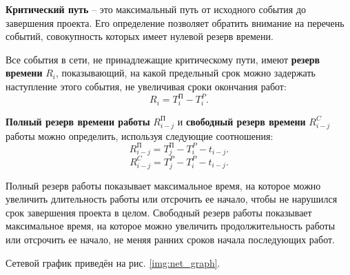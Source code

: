 \textbf{Критический путь} – это максимальный путь от исходного события до завершения проекта. Его определение позволяет обратить внимание на перечень событий, совокупность которых имеет нулевой резерв времени.

Все события в сети, не принадлежащие критическому пути, имеют \textbf{резерв времени} $R_i$,  показывающий, на какой предельный срок можно задержать наступление этого события, не увеличивая сроки окончания работ:
\begin{equation}
  \label{eq:R_i}
R_i = T_i^\textrm{П} - T_i^P.
\end{equation}

\textbf{Полный резерв времени работы} $R_{i-j}^\textrm{П}$ и \textbf{свободный резерв времени} $R_{i-j}^C$ работы можно определить, используя следующие соотношения:
\begin{equation}
  \label{eq:R_ij_full}
R_{i-j}^\textrm{П} = T_j^\textrm{П} - T_i^P - t_{i-j}.
\end{equation}
\begin{equation}
  \label{eq:R_ij^C}
R_{i-j}^C = T_j^P - T_i^P - t_{i-j}.
\end{equation}

Полный резерв работы показывает максимальное время, на которое можно увеличить длительность работы или отсрочить ее начало, чтобы не нарушился срок завершения проекта в целом. Свободный резерв работы показывает максимальное время, на которое можно увеличить продолжительность работы или отсрочить ее начало, не меняя ранних сроков начала последующих работ.

Сетевой график приведён на рис. \ref{img:net_graph}.